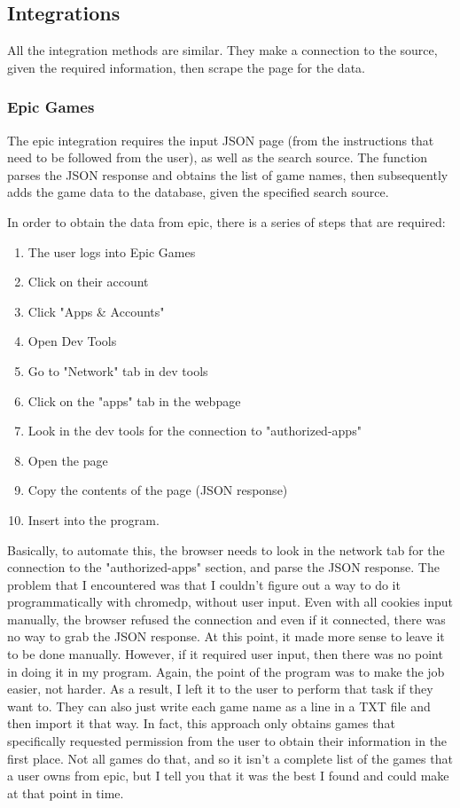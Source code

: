 \subsection{Integrations}
\label{subsec:Integrations}

All the integration methods are similar. They make a connection to
the source, given the required information, then scrape the page for the data.

\subsubsection{Epic Games}
\label{subsubsec:EpicInt}

The epic integration requires the input JSON page (from the
instructions that need to be followed from the user), as well as the
search source.
The function parses the JSON response and obtains the list of game
names, then subsequently adds the game data to the database, given
the specified search source.

In order to obtain the data from epic, there is a series of steps
that are required:
\begin{enumerate}
	\item The user logs into Epic Games
	\item Click on their account
	\item Click "Apps \& Accounts"
	\item Open Dev Tools
	\item Go to "Network" tab in dev tools
	\item Click on the "apps" tab in the webpage
	\item Look in the dev tools for the connection to "authorized-apps"
	\item Open the page
	\item Copy the contents of the page (JSON response)
	\item Insert into the program.
\end{enumerate}

Basically, to automate this, the browser needs to look in the network
tab for the connection to the "authorized-apps" section, and parse
the JSON response.
The problem that I encountered was that I couldn't figure out a way
to do it programmatically with chromedp, without user input. Even
with all cookies input manually, the browser refused the connection
and even if it connected, there was no way to grab the JSON response.
At this point, it made more sense to leave it to be done manually.
However, if it
required user input, then there was no point in doing it in my
program. Again, the point of the program was to make the job easier, not harder.
As a result, I left it to the user to perform that task if they want
to. They can also just write each game name as a line in a TXT file
and then import it that way.
In fact, this approach only obtains games that specifically requested
permission from the user to obtain their information in the first place.
Not all games do that, and so it isn't a complete list of the games
that a user owns from epic, but I tell you that it was the best I
found and could make at that point in time.

